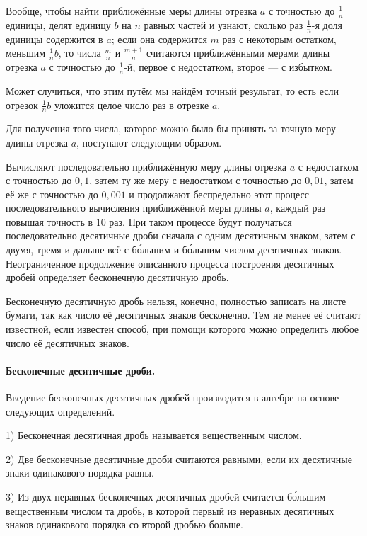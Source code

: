 \documentclass[oneside]{book}
\begin{document}
Вообще, чтобы найти приближённые меры длины отрезка $a$ с точностью до $\tfrac1n$ единицы, делят единицу $b$ на $n$ равных частей и узнают, сколько раз $\tfrac1n$-я доля единицы содержится в $a$;
если она содержится $m$ раз с некоторым остатком, меньшим $\tfrac1n b$, то числа $\tfrac mn$ и $\tfrac {m+1}n$ считаются приближёнными мерами длины отрезка $a$ с точностью до $\tfrac1n$-й, первое с недостатком, второе — с избытком.

Может случиться, что этим путём мы найдём точный результат, то есть если отрезок $\tfrac1n b$ уложится целое число раз в отрезке $a$.

Для получения того числа, которое можно было бы принять за точную меру длины отрезка $a$, поступают следующим образом.

Вычисляют последовательно приближённую меру длины отрезка $a$ с недостатком с точностью до $0{,}1$, затем ту же меру с недостатком с точностью до $0{,}01$, затем её же с точностью до $0{,}001$ и продолжают беспредельно этот процесс последовательного вычисления приближённой меры длины $a$, каждый раз повышая точность в 10 раз.
При таком процессе будут получаться последовательно десятичные дроби сначала с одним десятичным знаком, затем с двумя, тремя и дальше всё с б\'{о}льшим и б\'{о}льшим числом десятичных знаков.
Неограниченное продолжение описанного процесса построения десятичных дробей определяет бесконечную десятичную дробь.

Бесконечную десятичную дробь нельзя, конечно, полностью записать на листе бумаги, так как число её десятичных знаков бесконечно.
Тем не менее её считают известной, если известен способ, при помощи которого можно определить любое число её десятичных знаков.


\paragraph{Бесконечные десятичные дроби.}\label{1938/151}
Введение бесконечных десятичных дробей производится в алгебре на основе следующих определений.

1) Бесконечная десятичная дробь называется вещественным числом.

2) Две бесконечные десятичные дроби считаются равными, если их десятичные знаки одинакового порядка равны.

3) Из двух неравных бесконечных десятичных дробей считается б\'{о}льшим вещественным числом та дробь, в которой первый из неравных десятичных знаков одинакового порядка со второй дробью больше.
\end{document}
